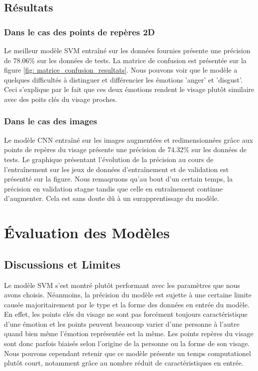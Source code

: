 \documentclass{rapport}
\begin{document}
\subsection{Résultats}

\subsubsection{Dans le cas des points de repères 2D}

Le meilleur modèle SVM entraîné sur les données fournies présente une précision de 78.06\% sur les données de tests. La matrice de confusion est présentée
sur la figure \ref*{fig: matrice_confusion_resultats}. Nous pouvons voir que le modèle a quelques difficultés à distinguer
et différencier les émotions 'anger' et 'disgust'. Ceci s'explique par le fait que ces deux émotions rendent le visage plutôt similaire avec
des poits clés du visage proches.\\


\subsubsection{Dans le cas des images}
Le modèle CNN entraîné sur les images augmentées et redimensionnées grâce aux points de repères du visage présente une précision
de 74.32\% sur les données de tests. Le graphique présentant l'évolution de la précision au cours de l'entraînement
sur les jeux de données d'entraînement et de validation est présentté sur la figure. Nous remaqruons qu'au bout d'un certain temps, la précision
en validation stagne tandis que celle en entraînement continue d'augmenter. Cela est sans doute dû à un surapprentissage du modèle.


\section{Évaluation des Modèles}
\subsection{Discussions et Limites}

Le modèle SVM s'est montré plutôt performant avec les paramètres que nous avons choisis. Néanmoins, la précision du modèle est sujette à une certaine limite causée
majoritairement par le type et la forme des données en entrée du modèle. En effet, les points clés du visage ne sont pas forcément toujours caractéristique d'une émotion
et les points peuvent beaucoup varier d'une personne à l'autre quand bien même l'émotion représentée est la même. Les points repères du visage sont donc parfois biaisés selon
l'origine de la personne ou la forme de son visage. Nous pouvons cependant retenir que ce modèle présente un temps computationel plutôt court, notamment grâce au nombre réduit
de caractéristiques en entrée.
\end{document}
